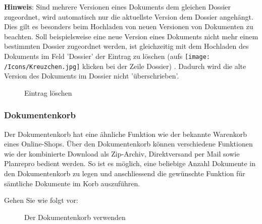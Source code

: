 \vspace{\baselineskip}

\textbf{Hinweis}: Sind mehrere Versionen eines Dokuments dem gleichen Dossier zugeordnet, wird automatisch nur die aktuellste Version dem Dossier angehängt. Dies gilt es besonders beim Hochladen von neuen Versionen von Dokumenten zu beachten. Soll beispielsweise eine neue Version eines Dokuments nicht mehr einem bestimmten Dossier zugeordnet werden, ist gleichzeitig mit dem Hochladen des Dokuments im Feld 'Dossier' der Eintrag zu löschen (aufs \texttt{[image: /Icons/Kreuzchen.jpg]} klicken bei der Zeile Dossier) . Dadurch wird die alte Version des Dokuments im Dossier nicht 'überschrieben'.

\begin{figure}[H]
\caption{Eintrag löschen}
\end{figure}


\subsubsection{Dokumentenkorb}
\label{bkm:Ref201705445}

Der Dokumentenkorb hat eine ähnliche Funktion wie der bekannte Warenkorb eines Online-Shops. Über den Dokumentenkorb können verschiedene Funktionen wie der kombinierte Download als Zip-Archiv, Direktversand per Mail sowie Planrepro bedient werden. So ist es möglich, eine beliebige Anzahl Dokumente in den Dokumentenkorb zu legen und anschliessend die gewünschte Funktion für sämtliche Dokumente im Korb auszuführen.

\vspace{\baselineskip}

Gehen Sie wie folgt vor:

\begin{figure}[H]
\vspace{-15pt}
\caption{Der Dokumentenkorb verwenden}
\end{figure}

